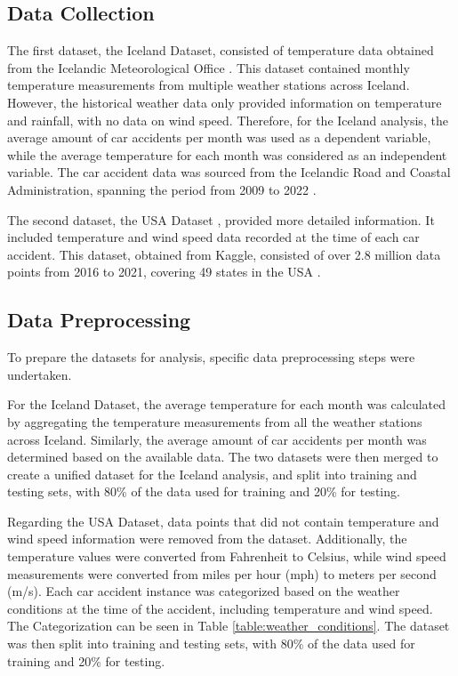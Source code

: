 \documentclass{article}
\begin{document}
\subsection{Data Collection}

The first dataset, the Iceland Dataset, consisted of temperature data obtained from the Icelandic Meteorological Office \cite{isl_weather_data}. This dataset contained monthly temperature measurements from multiple weather stations across Iceland. However, the historical weather data only provided information on temperature and rainfall, with no data on wind speed. Therefore, for the Iceland analysis, the average amount of car accidents per month was used as a dependent variable, while the average temperature for each month was considered as an independent variable. The car accident data was sourced from the Icelandic Road and Coastal Administration, spanning the period from 2009 to 2022 \cite{isl_accident_data}.

The second dataset, the USA Dataset \cite{usa_data}, provided more detailed information. It included temperature and wind speed data recorded at the time of each car accident. This dataset, obtained from Kaggle, consisted of over 2.8 million data points from 2016 to 2021, covering 49 states in the USA \cite{usa_data}.

\subsection{Data Preprocessing}

To prepare the datasets for analysis, specific data preprocessing steps were undertaken.

For the Iceland Dataset, the average temperature for each month was calculated by aggregating the temperature measurements from all the weather stations across Iceland. Similarly, the average amount of car accidents per month was determined based on the available data. The two datasets were then merged to create a unified dataset for the Iceland analysis, and split into training and testing sets, with 80\% of the data used for training and 20\% for testing.

Regarding the USA Dataset, data points that did not contain temperature and wind speed information were removed from the dataset. Additionally, the temperature values were converted from Fahrenheit to Celsius, while wind speed measurements were converted from miles per hour (mph) to meters per second (m/s). Each car accident instance was categorized based on the weather conditions at the time of the accident, including temperature and wind speed. The Categorization can be seen in Table \ref{table:weather_conditions}. The dataset was then split into training and testing sets, with 80\% of the data used for training and 20\% for testing.
\end{document}
